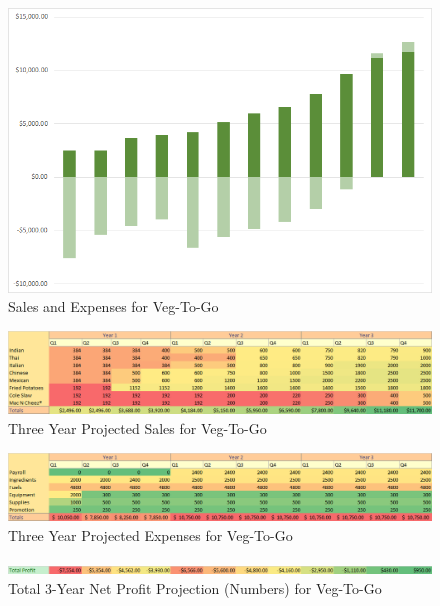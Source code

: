 \documentclass[12pt, letterpaper]{article}
\newcommand{\companyname}{Veg-To-Go}
\begin{document}
\begin{figure}[H]
	\caption{Sales and Expenses for \companyname{}}
	\includegraphics[width=\textwidth]{SalesAndExpenses}
\end{figure}

\begin{figure}[H]
	\label{products}
	\caption{Three Year Projected Sales for \companyname{}}
	\includegraphics[width=\textwidth]{SalesNumbers}
\end{figure}

\begin{figure}[H]
	\caption{Three Year Projected Expenses for \companyname{}}
	\includegraphics[width=\textwidth]{ExpensesNumbers}
\end{figure}

\begin{figure}[H]
	\caption{Total 3-Year Net Profit Projection (Numbers) for \companyname{}}
	\includegraphics[width=\textwidth]{TotalProfitNumbers}
\end{figure}
\end{document}
